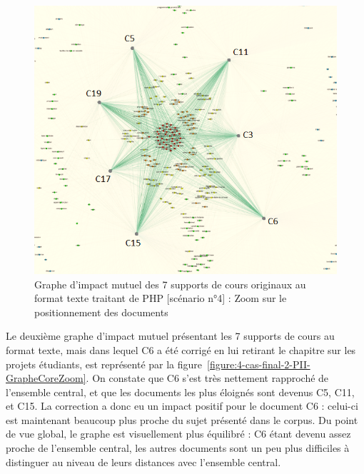 \begin{figure}[htb!]
\centering
\centerline{  %
\includegraphics[scale=0.69]{4-Experiences/images/cas-final/1-Full-Text-PHP_core-courses-written.png}
}
\caption{Graphe d'impact mutuel des 7 supports de cours originaux au format texte traitant de PHP [scénario n°4] : Zoom sur le positionnement des documents}
\label{figure:4-cas-final-1-PII-GrapheCoreZoom}
\end{figure}

\hspace{0pt}
\vfill

\clearpage

Le deuxième graphe d'impact mutuel présentant les 7 supports de cours au format texte, mais dans lequel C6 a été corrigé en lui retirant le chapitre sur les projets étudiants, est représenté par la figure~\ref{figure:4-cas-final-2-PII-GrapheCoreZoom}.
On constate que C6 s'est très nettement rapproché de l'ensemble central, et que les documents les plus éloignés sont devenus C5, C11, et C15.
La correction a donc eu un impact positif pour le document C6 : celui-ci est maintenant beaucoup plus proche du sujet présenté dans le corpus.
Du point de vue global, le graphe est visuellement plus équilibré : C6 étant devenu assez proche de l'ensemble central, les autres documents sont un peu plus difficiles à distinguer au niveau de leurs distances avec l'ensemble central.

